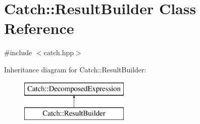 \hypertarget{classCatch_1_1ResultBuilder}{\section{Catch\-:\-:Result\-Builder Class Reference}
\label{classCatch_1_1ResultBuilder}
}


{\ttfamily \#include $<$catch.\-hpp$>$}

Inheritance diagram for Catch\-:\-:Result\-Builder\-:\begin{figure}[H]
\begin{center}
\leavevmode
\includegraphics[height=2.000000cm]{classCatch_1_1ResultBuilder}
\end{center}
\end{figure}
